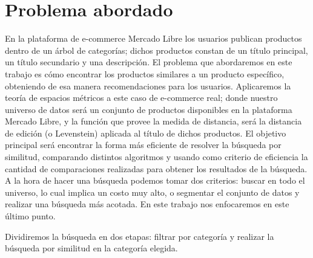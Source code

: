 \section{Problema abordado}

En la plataforma de e-commerce Mercado Libre los usuarios publican productos dentro de un \'arbol de categor\'ias; dichos productos constan de un t\'itulo principal, un t\'itulo secundario y una descripci\'on.
El problema que abordaremos en este trabajo es c\'omo encontrar los productos similares a un producto espec\'ifico, obteniendo de esa manera recomendaciones para los usuarios. Aplicaremos la teor\'ia de espacios m\'etricos a este caso de e-commerce real; donde nuestro universo de datos ser\'a un conjunto de productos disponibles en la plataforma Mercado Libre, y la funci\'on que provee la medida de distancia, ser\'a la distancia de edici\'on (o Levenstein) aplicada al t\'itulo de dichos productos.
El objetivo principal ser\'a encontrar la forma m\'as eficiente de resolver la b\'usqueda por similitud, comparando distintos algoritmos y usando como criterio de eficiencia la cantidad de comparaciones realizadas para obtener los resultados de la b\'usqueda.\\

A la hora de hacer una b\'usqueda podemos tomar dos criterios: buscar en todo el universo, lo cual implica un costo muy alto, o segmentar el conjunto de datos y realizar una b\'usqueda m\'as acotada. En este trabajo nos enfocaremos en este \'ultimo punto.\

Dividiremos la b\'usqueda en dos etapas: filtrar por categor\'ia y realizar la b\'usqueda por similitud en la categor\'ia elegida.
